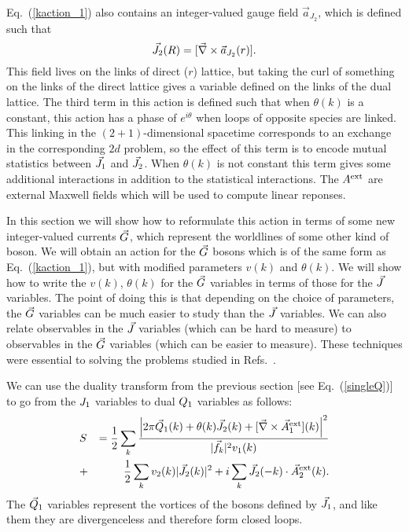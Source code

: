 Eq.~(\ref{kaction_1}) also contains an integer-valued gauge field $\vec{a}_{J_2}$, which is defined such that 
\begin{equation}
\vec{J}_2(R)=[\vec{\nabla}\times\vec{a}_{J_2}(r)].
\label{adef}
\end{equation}
 This field lives on the links of direct ($r$) lattice, but taking the curl of something on the links of the direct lattice gives a variable defined on the links of the dual lattice. The third term in this action is defined such that when $\theta(k)$ is a constant, this action has a phase of $e^{i\theta}$ when loops of opposite species are linked. This linking in the $(2+1)$-dimensional spacetime corresponds to an exchange in the corresponding $2d$ problem, so the effect of this term is to encode mutual statistics between $\vec{J}_1$ and $\vec{J}_2$. When $\theta(k)$ is not constant this term gives some additional interactions in addition to the statistical interactions. The $A^{\rm ext}$ are external Maxwell fields which will be used to compute linear reponses.

In this section we will show how to reformulate this action in terms of some new integer-valued currents $\vec{G}$, which represent the worldlines of some other kind of boson. We will obtain an action for the $\vec{G}$ bosons which is of the same form as Eq.~(\ref{kaction_1}), but with modified parameters $v(k)$ and $\theta(k)$. We will show how to write the $v(k)$, $\theta(k)$ for the $\vec{G}$ variables in terms of those for the $\vec{J}$ variables. The point of doing this is that depending on the choice of parameters, the $\vec{G}$ variables can be much easier to study than the $\vec{J}$ variables. We can also relate observables in the $\vec{J}$ variables (which can be hard to measure) to observables in the $\vec{G}$ variables (which can be easier to measure). These techniques were essential to solving the problems studied in Refs.~\cite{short_range3,Gen2Loops,FQHE}.

We can use the duality transform from the previous section [see Eq.~(\ref{singleQ})] to go from the $J_1$ variables to dual $Q_1$ variables as follows:
\begin{eqnarray}
&S&=\frac{1}{2}\sum_k \frac{\left|2\pi\vec{Q}_1(k)+\theta(k)\vec{J}_2(k)+[\vec{\nabla}\times\vec{A}_{1}^{\rm ext}](k)\right|^2}{|\vec{f}_k|^2v_1(k)}\nonumber\\
&+&\frac{1}{2}\sum_k v_2(k)|\vec{J}_2(k)|^2 + i \sum_k \vec{J}_2(-k) \cdot \vec{A}_{2}^{\rm ext}(k).
\label{JQ1}
\end{eqnarray}
The $\vec{Q}_1$ variables represent the vortices of the bosons defined by $\vec{J}_1$, and like them they are divergenceless and therefore form closed loops.

